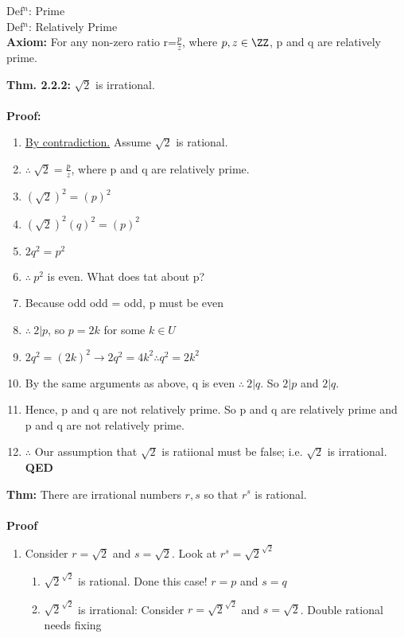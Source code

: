 
Def$^n$: Prime \\
Def$^n$: Relatively Prime \\

\textbf{Axiom:} For any non-zero ratio r=$\frac{p}{z}$, where $p,z \in \ZZ$, p and q are relatively prime.


\textbf{Thm. 2.2.2:} $\sqrt{2}$ is irrational.
\\ \\
\textbf{Proof:} 
\begin{enumerate}
\item \underline{By contradiction.} Assume $\sqrt{2}$ is rational. 
\item $\therefore \ \sqrt{2} = \frac{p}{z}$, where p and q are relatively prime.
\item $\left( \sqrt{2} \right)^2 = (p)^2$
\item $\left( \sqrt{2} \right)^2 (q)^2 = (p)^2$
\item $2q^2 = p^2$
\item $\therefore\ p^2$ is even. What does tat about p?
\item Because odd odd = odd, p must be even
\item $\therefore\ 2|p$, so $p=2k$ for some $k\in U$
\item $2q^2 = (2k)^2 \to 2q^2 = 4k^2 \therefore q^2 = 2k^2$
\item By the same arguments as above, q is even $\therefore\ 2|q$. So $2|p$ and $2|q$.
\item Hence, p and q are not relatively prime. So p and q are relatively prime and p and q are not relatively prime.
\item $\therefore$ Our assumption that $\sqrt{2}$ is ratiional must be false; i.e. $\sqrt{2}$ is irrational. \textbf{QED}
\end{enumerate}

\textbf{Thm:} There are irrational  numbers $r,s$ so that $r^s$ is rational.
\\
\\
\textbf{Proof}
\begin{enumerate}
\item Consider $r=\sqrt{2}$ and $s=\sqrt{2}$. Look at $r^s=\sqrt{2}^{\sqrt{2}}$
\begin{enumerate}
	\item $\sqrt{2}^{\sqrt{2}}$ is rational. Done this case! $r=p$ and $s=q$
	\item $\sqrt{2}^{\sqrt{2}}$ is irrational: Consider $r=\sqrt{2}^{\sqrt{2}}$ and $s=\sqrt{2}$. Double rational needs fixing%
\end{enumerate}
\end{enumerate}

